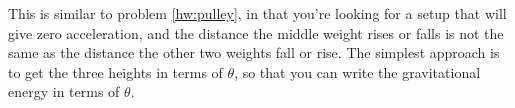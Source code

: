 This is similar to problem
\ref{hw:pulley}, in that you're looking for a setup that will give zero
acceleration, and the distance the middle weight rises or falls is not the same as the distance
the other two weights fall or rise. The simplest approach is to get the three heights
in terms of $\theta$, so that you can write the gravitational energy in terms of $\theta$.

